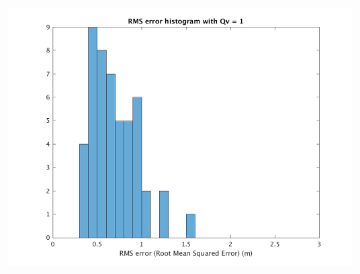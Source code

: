 \documentclass[paper=a4, fontsize=11pt]{scrartcl} %
\numberwithin{equation}{section} %
\numberwithin{figure}{section} %
\numberwithin{table}{section} %
\begin{document}
\begin{figure}[H]
\begin{subfigure}[b]{0.6\textwidth}
{		  \includegraphics[width=\textwidth]{hist3.png}
		}
	\end{subfigure}
\end{figure} 
\end{document}

